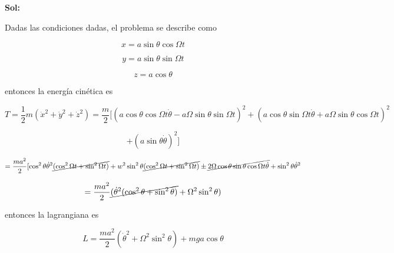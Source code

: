 \documentclass[12pt,a4paper]{article}
\begin{document}
\begin{enumerate}
        \textbf{Sol:}
        
        Dadas las condiciones dadas, el problema se describe como
        
        \begin{equation*}
            x = a \sin{\theta} \cos{\Omega t}
        \end{equation*}
        
        \begin{equation*}
            y = a \sin{\theta} \sin{\Omega t}
        \end{equation*}
        
        \begin{equation*}
            z = a \cos{\theta}
        \end{equation*}
        
        entonces la energía cinética es
        
        \begin{equation*}
            T = \frac{1}{2} m (\dot{x}^2 + \dot{y}^2 + \dot{z}^2) = \frac{m}{2} [(a\cos{\theta}\cos{\Omega t} \dot{\theta} - a \Omega \sin{\theta}\sin{\Omega t} )^2 + (a \cos{\theta}\sin{\Omega t} \dot{\theta} + a \Omega \sin{\theta} \cos{\Omega t})^2
        \end{equation*}
        
        \begin{equation*}
             + (a\sin{\theta}\dot{\theta})^2]
        \end{equation*}
        
        \begin{equation*}
            = \frac{ma^2}{2}[\cos^2{\theta} \dot{\theta}^2 \cancel{(\cos^2{\Omega t} + \sin^2{\Omega t})} + w^2 \sin^2{\theta} \cancel{(\cos^2{\Omega t} + \sin^2{\Omega t})}\pm \cancel{2\Omega \cos{\theta}\sin{\theta}\cos{\Omega t} \dot{\theta}} + \sin^2{\theta}\dot{\theta}^2
        \end{equation*}
        
        \begin{equation*}
            = \frac{ma^2}{2}\cancel{(\dot{\theta}^2 (\cos^2{\theta} + \sin^2{\theta})} + \Omega^2 \sin^2{\theta})
        \end{equation*}
        
        entonces la lagrangiana es
        
        \begin{equation*}
            L = \frac{ma^2}{2}(\dot{\theta}^2 + \Omega^2 \sin^2{\theta})   + mga \cos{\theta}
        \end{equation*}
        

\end{enumerate}
\end{document}
